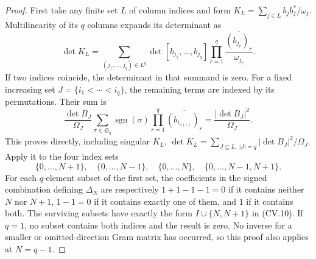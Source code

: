 \begin{proof}
First take any finite set $L$ of column indices and form
$K_L=\sum_{j\in L}b_jb_j^*/\omega_j$. Multilinearity of its
$q$ columns expands its determinant as
\[
 \det K_L=
 \sum_{(j_1,\ldots,j_q)\in L^q}
 \det[b_{j_1},\ldots,b_{j_q}]
 \prod_{r=1}^q\frac{\overline{(b_{j_r})_r}}{\omega_{j_r}}.
\]
If two indices coincide, the determinant in that summand is zero.
For a fixed increasing set $J=\{i_1<\cdots<i_q\}$, the remaining
terms are indexed by its permutations. Their sum is
\[
 \frac{\det B_J}{\Omega_J}
 \sum_{\sigma\in\mathfrak S_q}\operatorname{sgn}(\sigma)
       \prod_{r=1}^q\overline{(b_{i_{\sigma(r)}})_r}
 =\frac{|\det B_J|^2}{\Omega_J}.
\]
This proves directly, including singular $K_L$,
$\det K_L=\sum_{J\subseteq L,\ |J|=q}|\det B_J|^2/\Omega_J$.
Apply it to the four index sets
\[
 \{0,\ldots,N+1\},\quad \{0,\ldots,N-1\},\quad
 \{0,\ldots,N\},\quad \{0,\ldots,N-1,N+1\}.
\]
For each $q$-element subset of the first set, the coefficients in
the signed combination defining $\Delta_N$ are respectively
$1+1-1-1=0$ if it contains neither $N$ nor $N+1$,
$1-1=0$ if it contains exactly one of them, and $1$ if it
contains both. The surviving subsets have exactly the form
$I\cup\{N,N+1\}$ in (CV.10). If $q=1$, no subset contains
both indices and the result is zero. No inverse for a smaller
or omitted-direction Gram matrix has occurred, so this proof
also applies at $N=q-1$.
\end{proof}

